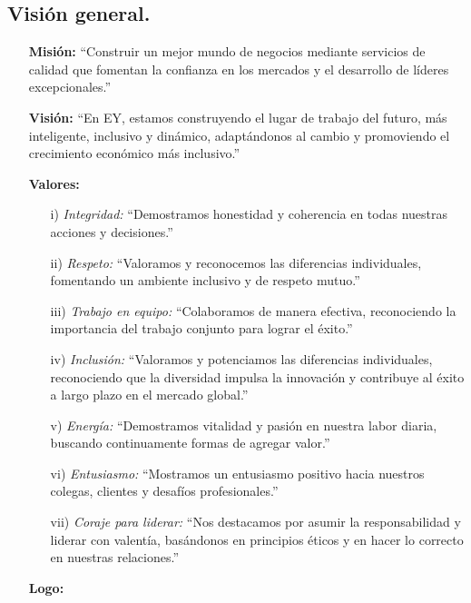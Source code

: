 \documentclass{article}
\begin{document}
\subsection{Visión general.}

\begin{itemize}
\item[\textbf{Misión:}] ``Construir un mejor mundo de negocios mediante servicios de calidad que fomentan la confianza en los mercados y el desarrollo de líderes excepcionales.''

\item[\textbf{Visión:}] ``En EY, estamos construyendo el lugar de trabajo del futuro, más inteligente, inclusivo y dinámico, adaptándonos al cambio y promoviendo el crecimiento económico más inclusivo.''

\item[\textbf{Valores:}] 

\begin{enumerate}
    
    \item[i)] \emph{Integridad:} ``Demostramos honestidad y coherencia en todas nuestras acciones y decisiones.''  
    \item[ii)] \emph{Respeto:} ``Valoramos y reconocemos las diferencias individuales, fomentando un ambiente inclusivo y de respeto mutuo.'' 
    \item[iii)] \emph{Trabajo en equipo:} ``Colaboramos de manera efectiva, reconociendo la importancia del trabajo conjunto para lograr el éxito.''
    \item[iv)] \emph{Inclusión:} ``Valoramos y potenciamos las diferencias individuales, reconociendo que la diversidad impulsa la innovación y contribuye al éxito a largo plazo en el mercado global.''
    \item[v)] \emph{Energía:}  ``Demostramos vitalidad y pasión en nuestra labor diaria, buscando continuamente formas de agregar valor.''
    \item[vi)] \emph{Entusiasmo:} ``Mostramos un entusiasmo positivo hacia nuestros colegas, clientes y desafíos profesionales.''
    \item[vii)] \emph{Coraje para liderar:}  ``Nos destacamos por asumir la responsabilidad y liderar con valentía, basándonos en principios éticos y en hacer lo correcto en nuestras relaciones.''
   
\end{enumerate}

\item[\textbf{Logo:}]
\end{itemize}
\end{document}
